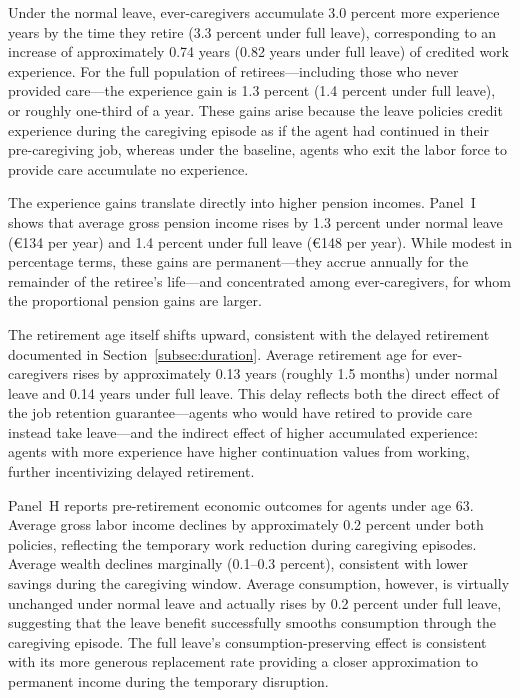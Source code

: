 Under the normal leave, ever-caregivers accumulate 3.0 percent more experience years by the time they retire (3.3 percent under full leave), corresponding to an increase of approximately 0.74 years (0.82 years under full leave) of credited work experience. For the full population of retirees---including those who never provided care---the experience gain is 1.3 percent (1.4 percent under full leave), or roughly one-third of a year. These gains arise because the leave policies credit experience during the caregiving episode as if the agent had continued in their pre-caregiving job, whereas under the baseline, agents who exit the labor force to provide care accumulate no experience.

The experience gains translate directly into higher pension incomes. Panel~I shows that average gross pension income rises by 1.3 percent under normal leave (\euro{134} per year) and 1.4 percent under full leave (\euro{148} per year). While modest in percentage terms, these gains are permanent---they accrue annually for the remainder of the retiree's life---and concentrated among ever-caregivers, for whom the proportional pension gains are larger.

The retirement age itself shifts upward, consistent with the delayed retirement documented in Section~\ref{subsec:duration}. Average retirement age for ever-caregivers rises by approximately 0.13 years (roughly 1.5 months) under normal leave and 0.14 years under full leave. This delay reflects both the direct effect of the job retention guarantee---agents who would have retired to provide care instead take leave---and the indirect effect of higher accumulated experience: agents with more experience have higher continuation values from working, further incentivizing delayed retirement.

Panel~H reports pre-retirement economic outcomes for agents under age 63. Average gross labor income declines by approximately 0.2 percent under both policies, reflecting the temporary work reduction during caregiving episodes. Average wealth declines marginally (0.1--0.3 percent), consistent with lower savings during the caregiving window. Average consumption, however, is virtually unchanged under normal leave and actually rises by 0.2 percent under full leave, suggesting that the leave benefit successfully smooths consumption through the caregiving episode. The full leave's consumption-preserving effect is consistent with its more generous replacement rate providing a closer approximation to permanent income during the temporary disruption.


